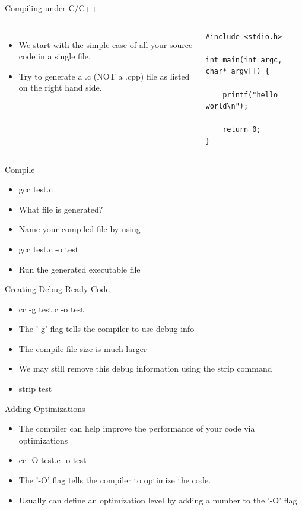 \documentclass{beamer}
\begin{document}
\begin{frame}[fragile]{Compiling under C/C++}
\begin{columns}[c]
\begin{itemize}
\item We start with the simple case of all your source code in a single file.
\item Try to generate a .c (NOT a .cpp) file as listed on the right hand side.
\end{itemize}
\begin{lstlisting}
#include <stdio.h>

int main(int argc, char* argv[]) {

    printf("hello world\n");

    return 0;
}
\end{lstlisting}
\end{columns}
\end{frame}

\begin{frame}{Compile}
\begin{itemize}
\item gcc test.c 
\item What file is generated?
\item Name your compiled file by using
\item gcc test.c -o test
\item Run the generated executable file
\end{itemize}
\end{frame}

\begin{frame}{Creating Debug Ready Code}
\begin{itemize}
\item cc -g test.c -o test
\item The '-g' flag tells the compiler to use debug info
\item The compile file size is much larger
\item We may still remove this debug information using the strip command 
\item strip test
\end{itemize}
\end{frame}

\begin{frame}{Adding Optimizations}
\begin{itemize}
\item The compiler can help improve the performance of your code via optimizations
\item cc -O test.c -o test
\item The '-O' flag tells the compiler to optimize the code. 
\item Usually can define an optimization level by adding a number to the '-O' flag
\end{itemize}
\end{frame}
\end{document}
